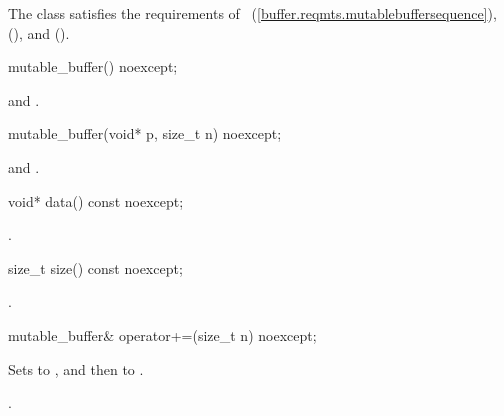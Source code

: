 \pnum
The  class satisfies the requirements of ~(\ref{buffer.reqmts.mutablebuffersequence}),  (), and  ().

%
\begin{itemdecl}
mutable_buffer() noexcept;
\end{itemdecl}

\begin{itemdescr}
\pnum
\postconditions {} and .
\end{itemdescr}

%
\begin{itemdecl}
mutable_buffer(void* p, size_t n) noexcept;
\end{itemdecl}

\begin{itemdescr}
\pnum
\postconditions {} and .
\end{itemdescr}

%
\begin{itemdecl}
void* data() const noexcept;
\end{itemdecl}

\begin{itemdescr}
\pnum
\returns {}.
\end{itemdescr}

%
\begin{itemdecl}
size_t size() const noexcept;
\end{itemdecl}

\begin{itemdescr}
\pnum
\returns {}.
\end{itemdescr}

%
\begin{itemdecl}
mutable_buffer& operator+=(size_t n) noexcept;
\end{itemdecl}

\begin{itemdescr}
\pnum
\effects Sets  to ,
and then  to .

\pnum
\returns {}.
\end{itemdescr}


